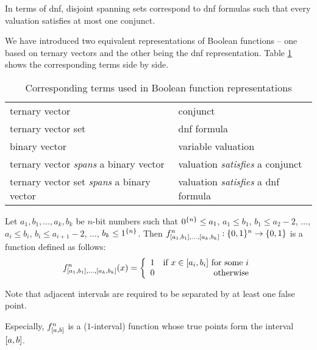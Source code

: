 In terms of \acrshort{dnf},
disjoint spanning sets
correspond to \acrshort{dnf} formulas
such that every valuation satisfies at most one conjunct.

We have introduced two equivalent representations
of Boolean functions --
one based on ternary vectors
and the other being the \acrshort{dnf} representation.
Table \ref{table:representations}
shows the corresponding terms side by side.

\begin{table}[h]
\label{table:representations}
\centering
\begin{tabular}{ll}
ternary vector & conjunct \\
ternary vector set & \acrshort{dnf} formula \\
binary vector & variable valuation \\
ternary vector \emph{spans} a binary vector &
valuation \emph{satisfies} a conjunct \\
ternary vector set \emph{spans} a binary vector &
valuation \emph{satisfies} a \acrshort{dnf} formula
\end{tabular}
\caption{
Corresponding terms used
in Boolean function representations
}
\end{table}


\begin{definition}
\label{def:kibf}
Let $a_1, b_1, \ldots, a_k, b_k$ be $n$-bit numbers
such that $0^{\{n\}} \leq a_1$,
$a_1 \leq b_1$,
$b_1 \leq a_2 - 2$,
$\ldots$,
$a_i \leq b_i$,
$b_i \leq a_{i+1} - 2$,
$\ldots$,
$b_k \leq 1^{\{n\}}$.
Then $f^n_{[a_1, b_1], \ldots, [a_k, b_k]}: \{0, 1\}{}^n \rightarrow \{0, 1\}{}$ is a function defined as follows:
\[f^n_{\interval{a_1}{b_1}, \ldots, \interval{a_k}{b_k}} (x) = \left\{
  \begin{array}{lr}
    1 & $if $ x \in \interval{a_i}{b_i}$ for some $i\\
    0 & $otherwise$
  \end{array}
\right.
\]
\end{definition}

Note that adjacent intervals
are required to be separated by at least one false point.

Especially,
$f^n_{[a, b]}$ is a ($1$-interval) function
whose true points form the interval $[a, b]$.
